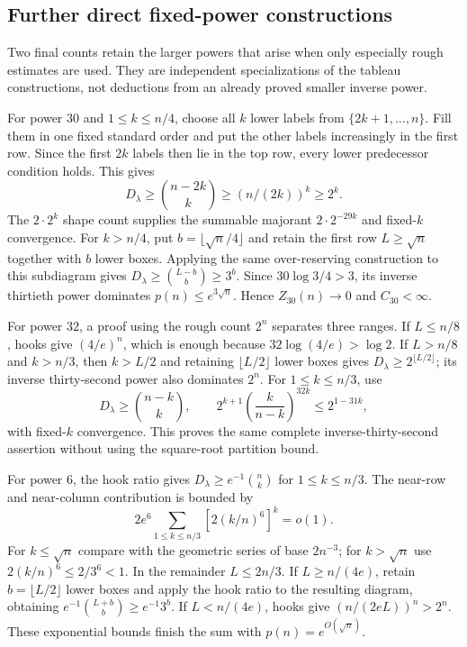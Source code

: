 \subsection{Further direct fixed-power constructions}
\label{l:degree-fixed-powers}

Two final counts retain the larger powers that arise when only
especially rough estimates are used.  They are independent
specializations of the tableau constructions, not deductions from
an already proved smaller inverse power.

For power $30$ and $1\le k\le n/4$, choose all $k$ lower labels
from $\{2k+1,\ldots,n\}$.  Fill them in one fixed standard order
and put the other labels increasingly in the first row.  Since the
first $2k$ labels then lie in the top row, every lower predecessor
condition holds.  This gives
\begin{equation}\label{l:degree-thirty-prefill}
 D_\lambda\ge\binom{n-2k}k
       \ge(n/(2k))^k\ge2^k.
\end{equation}
The $2\cdot2^k$ shape count supplies the summable majorant
$2\cdot2^{-29k}$ and fixed-$k$ convergence.
For $k>n/4$, put $b=\lfloor\sqrt n/4\rfloor$ and retain the
first row $L\ge\sqrt n$ together with $b$ lower boxes.
Applying the same over-reserving construction to this subdiagram
gives $D_\lambda\ge\binom{L-b}b\ge3^b$.
Since $30\log3/4>3$, its inverse thirtieth power dominates
$p(n)\le e^{3\sqrt n}$.  Hence $Z_{30}(n)\to0$ and $C_{30}<\infty$.

For power $32$, a proof using the rough count $2^n$ separates
three ranges.  If $L\le n/8$, hooks give $(4/e)^n$, which is
enough because $32\log(4/e)>\log2$.
If $L>n/8$ and $k>n/3$, then $k>L/2$ and retaining
$\lfloor L/2\rfloor$ lower boxes gives
$D_\lambda\ge2^{\lfloor L/2\rfloor}$; its inverse thirty-second
power also dominates $2^n$.  For $1\le k\le n/3$, use
\[
 D_\lambda\ge\binom{n-k}k,\qquad
 2^{k+1}\left(\frac{k}{n-k}\right)^{32k}\le2^{1-31k},
\]
with fixed-$k$ convergence.  This proves the same complete
inverse-thirty-second assertion without using the square-root
partition bound.

For power $6$, the hook ratio gives
$D_\lambda\ge e^{-1}\binom nk$ for $1\le k\le n/3$.
The near-row and near-column contribution is bounded by
\begin{equation}\label{l:degree-six-hook-sum}
 2e^6\sum_{1\le k\le n/3}[2(k/n)^6]^k=o(1).
\end{equation}
For $k\le\sqrt n$ compare with the geometric series of base
$2n^{-3}$; for $k>\sqrt n$ use $2(k/n)^6\le2/3^6<1$.
In the remainder $L\le2n/3$.  If $L\ge n/(4e)$, retain
$b=\lfloor L/2\rfloor$ lower boxes and apply the hook ratio to
the resulting diagram, obtaining $e^{-1}\binom{L+b}b\ge e^{-1}3^b$.
If $L<n/(4e)$, hooks give $(n/(2eL))^n>2^n$.
These exponential bounds finish the sum with $p(n)=e^{O(\sqrt n)}$.

